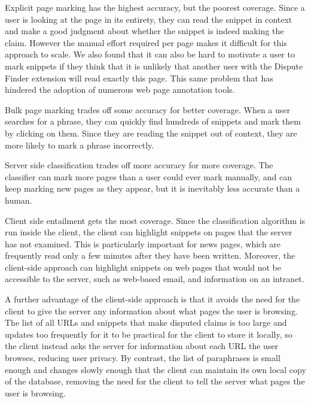 \documentclass{www2010-submission}
\begin{document}
Explicit page marking has the highest accuracy, but the poorest coverage. Since a user is looking at the page in its entirety, they can read the snippet in context and make a good judgment about whether the snippet is indeed making the claim. However the manual effort required per page makes it difficult for this approach to scale. We also found that it can also be hard to motivate a user to mark snippets if they think that it is unlikely that another user with the Dispute Finder extension will read exactly this page. This same problem that has hindered the adoption of numerous web page annotation tools.

Bulk page marking trades off some accuracy for better coverage. When a user searches for a phrase, they can quickly find hundreds of snippets and mark them by clicking on them. Since they are reading the snippet out of context, they are more likely to mark a phrase incorrectly. 

Server side classification trades off more accuracy for more coverage. The classifier can mark more pages than a user could ever mark manually, and can keep marking new pages as they appear, but it is inevitably less accurate than a human.

Client side entailment gets the most coverage. Since the classification algorithm is run inside the client, the client can highlight snippets on pages that the server has not examined. This is particularly important for news pages, which are frequently read only a few minutes after they have been written. Moreover, the client-side approach can highlight snippets on web pages that would not be accessible to the server, such as web-based email, and information on an intranet. 

A further advantage of the client-side approach is that it avoids the need for the client to give the server any information about what pages the user is browsing. The list of all URLs and snippets that make disputed claims is too large and updates too frequently for it to be practical for the client to store it locally, so the client instead asks the server for information about each URL the user browses, reducing user privacy. By contrast, the list of paraphrases is small enough and changes slowly enough that the client can maintain its own local copy of the database, removing the need for the client to tell the server what pages the user is browsing.
\end{document}
